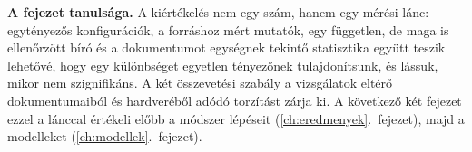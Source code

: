 \bigskip
\noindent\textbf{A fejezet tanulsága.} A kiértékelés nem egy szám, hanem egy mérési lánc: egytényezős
konfigurációk, a forráshoz mért mutatók, egy független, de maga is ellenőrzött bíró és a dokumentumot
egységnek tekintő statisztika együtt teszik lehetővé, hogy egy különbséget egyetlen tényezőnek
tulajdonítsunk, és lássuk, mikor nem szignifikáns. A két összevetési szabály a vizsgálatok eltérő
dokumentumaiból és hardveréből adódó torzítást zárja ki. A következő két fejezet ezzel a lánccal értékeli
előbb a módszer lépéseit (\ref{ch:eredmenyek}.~fejezet), majd a modelleket (\ref{ch:modellek}.~fejezet).
